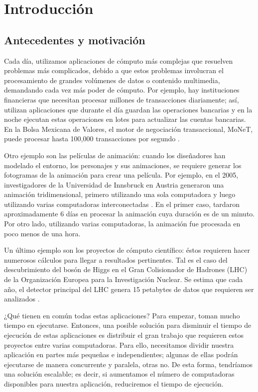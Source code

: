 \chapter{Introducción}

\section{Antecedentes y motivación}

Cada día, utilizamos aplicaciones de cómputo más complejas que resuelven problemas más complicados, debido a que estos problemas involucran el procesamiento de grandes volúmenes de datos o contenido multimedia, demandando cada vez más poder de cómputo. Por ejemplo, hay instituciones financieras que necesitan procesar millones de transacciones diariamente; así, utilizan aplicaciones que durante el día guardan las operaciones bancarias y en la noche ejecutan estas operaciones en lotes para actualizar las cuentas bancarias. En la Bolsa Mexicana de Valores, el motor de negociación transaccional, MoNeT, puede procesar hasta 100,000 transacciones por segundo \cite{bmv2012informe}. 

Otro ejemplo son las películas de animación: cuando los diseñadores han modelado el entorno, los personajes y sus animaciones, se requiere generar los fotogramas de la animación para crear una película. Por ejemplo, en el 2005, investigadores de la Universidad de Innsbruck en Austria generaron una animación tridimensional, primero utilizando una sola computadora y luego utilizando varias computadoras interconectadas \cite{nerieri2005using}. En el primer caso, tardaron aproximadamente 6 días en procesar la animación cuya duración es de un minuto. Por otro lado, utilizando varias computadoras, la animación fue procesada en poco menos de una hora.

Un último ejemplo son los proyectos de cómputo científico: éstos requieren hacer numerosos cálculos para llegar a resultados pertinentes. Tal es el caso del descubrimiento del bosón de Higgs en el Gran Colisionador de Hadrones (LHC) de la Organización Europea para la Investigación Nuclear. Se estima que cada año, el detector principal del LHC genera 15 petabytes de datos que requieren ser analizados \cite{shiers2007worldwide}. %

¿Qué tienen en común todas estas aplicaciones? Para empezar, toman mucho tiempo en ejecutarse. Entonces, una posible solución para disminuir el tiempo de ejecución de estas aplicaciones es distribuir el gran trabajo que requieren estos proyectos entre varias computadoras. Para ello, necesitamos dividir nuestra aplicación en partes más pequeñas e independientes; algunas de ellas podrán ejecutarse de manera concurrente y paralela, otras no. De esta forma, tendríamos una solución escalable; es decir, si aumentamos el número de computadoras disponibles para nuestra aplicación, reduciremos el tiempo de ejecución.

